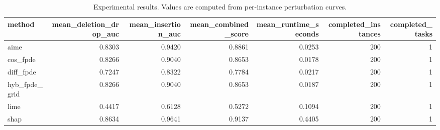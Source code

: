 \begin{table}[t]
\caption{Experimental results. Values are computed from per-instance perturbation curves.}
\label{tab:main_results_computed}
\centering
\begin{tabular}{lrrrrrr}
\toprule
method & mean\_deletion\_drop\_auc & mean\_insertion\_auc & mean\_combined\_score & mean\_runtime\_seconds & completed\_instances & completed\_tasks \\
\midrule
aime & 0.8303 & 0.9420 & 0.8861 & 0.0253 & 200 & 1 \\
cos\_fpde & 0.8266 & 0.9040 & 0.8653 & 0.0178 & 200 & 1 \\
diff\_fpde & 0.7247 & 0.8322 & 0.7784 & 0.0217 & 200 & 1 \\
hyb\_fpde\_grid & 0.8266 & 0.9040 & 0.8653 & 0.0187 & 200 & 1 \\
lime & 0.4417 & 0.6128 & 0.5272 & 0.1094 & 200 & 1 \\
shap & 0.8634 & 0.9641 & 0.9137 & 0.4405 & 200 & 1 \\
\bottomrule
\end{tabular}

\end{table}
